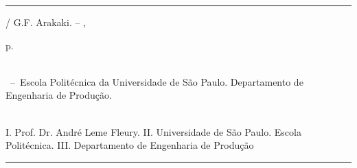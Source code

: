 \begin{fichacatalografica}\label{ficha catalografica}
	\vspace*{\fill}					%
	\hrule							%
	\begin{center}					%
	\begin{minipage}[c]{12.5cm}		%
	
	\imprimirautor
	
	\hspace{0.5cm} \imprimirtitulo  / G.F. Arakaki. --
	\imprimirlocal, \imprimirdata
	
	\hspace{0.5cm} \pageref{LastPage} p.\\
	
	\hspace{0.5cm} \imprimirorientadorRotulo~\imprimirorientador\\
	
	\hspace{0.5cm}
	\parbox[t]{\textwidth}{\imprimirtipotrabalho~--~Escola Politécnica da Universidade de São Paulo. Departamento de Engenharia de Produção.}\\
	
	\hspace{0.5cm}
		I. Prof. Dr. André Leme Fleury.
		II. Universidade de São Paulo. Escola Politécnica.
		III. Departamento de Engenharia de Produção\\ 
	
	
	\end{minipage}
	\end{center}
	\hrule
\end{fichacatalografica}